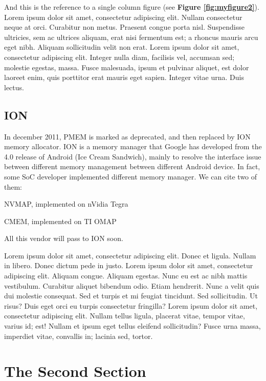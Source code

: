 \documentclass[a4paper,10pt]{article}
\begin{document}
\begin{multicols}{2}
And this is the reference to a single column figure (see {\bf Figure
\ref{fig:myfigure2}}). Lorem ipsum dolor sit amet, consectetur adipiscing elit.
Nullam consectetur neque at orci. Curabitur non metus. Praesent congue porta
nisl. Suspendisse ultricies, sem ac ultrices aliquam, erat nisi fermentum est; a
rhoncus mauris arcu eget nibh. Aliquam sollicitudin velit non erat. Lorem ipsum
dolor sit amet, consectetur adipiscing elit. Integer nulla diam, facilisis vel,
accumsan sed; molestie egestas, massa. Fusce malesuada, ipsum et pulvinar
aliquet, est dolor laoreet enim, quis porttitor erat mauris eget sapien. Integer
vitae urna. Duis lectus.

\subsection{ION}
In december 2011, PMEM is marked as deprecated, and then replaced by ION memory 
allocator.
ION is a memory manager that Google has developed from the 4.0 release
of Android (Ice Cream Sandwich), mainly to resolve the interface issue between different
memory management between different Android device.
In fact, some SoC developer implemented different memory manager. We can cite two of
them:\\
\begin{list}{}{}
 \item NVMAP, implemented on nVidia Tegra
 \item CMEM, implemented on TI OMAP
\end{list}
All this vendor will pass to ION soon.

Lorem ipsum dolor sit amet, consectetur adipiscing elit. Donec et ligula. Nullam
in libero. Donec dictum pede in justo. Lorem ipsum dolor sit amet, consectetur
adipiscing elit. Aliquam congue. Aliquam egestas. Nunc eu est ac nibh mattis
vestibulum. Curabitur aliquet bibendum odio. Etiam hendrerit. Nunc a velit quis
dui molestie consequat. Sed et turpis et mi feugiat tincidunt. Sed sollicitudin.
Ut risus? Duis eget orci eu turpis consectetur fringilla? Lorem ipsum dolor sit
amet, consectetur adipiscing elit. Nullam tellus ligula, placerat vitae, tempor
vitae, varius id; est! Nullam et ipsum eget tellus eleifend sollicitudin? Fusce
urna massa, imperdiet vitae, convallis in; lacinia sed, tortor.

\section{The Second Section}


\end{multicols}
\end{document}
